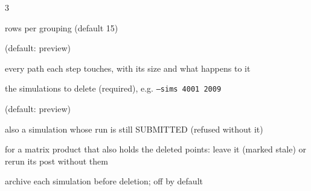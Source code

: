 \begin{multicols}{3}
\begin{flags}
\item {} rows per grouping (default 15) \quad {}
\end{flags}
\begin{flags}
\item {} (default: preview) \quad {} \quad {}
\item {} every path each step touches, with its size and what happens to it
\end{flags}
\begin{flags}
\item {} the simulations to delete (required), e.g. \texttt{--sims 4001 2009}
\item {} (default: preview) \quad {} \quad {}
\item {} also a simulation whose run is still SUBMITTED (refused without it)
\item {} for a matrix product that also holds the deleted points: leave it (marked stale) or rerun its post without them
\item {} archive each simulation before deletion; off by default
\end{flags}

\vspace{2pt}


\end{multicols}
